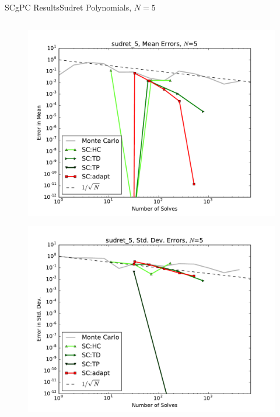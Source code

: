 \documentclass{beamer}
\begin{document}
\begin{frame}{SCgPC Results}{Sudret Polynomials, $N=5$}
\begin{columns}
\begin{column}{0.5\textwidth}
\begin{figure}[h!]
          \includegraphics[width=0.8\linewidth]{anlmodels/sudret_5_mean_errs_nohdmr}
        \end{figure}
        \vspace{-20pt}
        \begin{figure}[h!]
          \centering
          \includegraphics[width=0.8\linewidth]{anlmodels/sudret_5_variance_errs_nohdmr}
        \end{figure}
   \end{column}
 \end{columns}
\end{frame}
\end{document}
